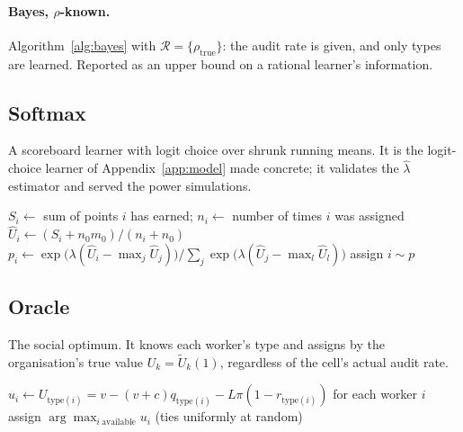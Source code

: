 \documentclass[11pt,letterpaper]{article}
\newcommand{\Ut}{\tilde U}
\numberwithin{equation}{section}
\numberwithin{table}{section}
\numberwithin{figure}{section}
\numberwithin{algorithm}{section}
\begin{document}
\paragraph{Bayes, $\rho$-known.} Algorithm~\ref{alg:bayes} with $\mathcal R=\{\rho_{\text{true}}\}$: the audit rate is given, and only types are learned. Reported as an upper bound on a rational learner's information.

\subsection{Softmax}

A scoreboard learner with logit choice over shrunk running means. It is the logit-choice learner of Appendix~\ref{app:model} made concrete; it validates the $\hat\lambda$ estimator and served the power simulations.

\begin{algorithm}[H]
\caption{Softmax ($\lambda=0.5$, $n_0=1$, $m_0=v$)}
\label{alg:softmax}
\begin{algorithmic}[1]
    \State $S_i\gets$ sum of points $i$ has earned; $n_i\gets$ number of times $i$ was assigned
    \State $\hat U_i\gets(S_i+n_0m_0)/(n_i+n_0)$ 
  \EndFor
  \State $p_i\gets\exp\bigl(\lambda(\hat U_i-\max_j\hat U_j)\bigr)\big/\sum_j\exp\bigl(\lambda(\hat U_j-\max_l\hat U_l)\bigr)$
  \State assign $i\sim p$
\EndFor
\end{algorithmic}
\end{algorithm}

\subsection{Oracle}

The social optimum. It knows each worker's type and assigns by the organisation's true value $U_k=\Ut_k(1)$, regardless of the cell's actual audit rate.

\begin{algorithm}[H]
\caption{Oracle}
\label{alg:oracle}
\begin{algorithmic}[1]
\State $u_i\gets U_{\text{type}(i)}=v-(v+c)q_{\text{type}(i)}-L\pi(1-r_{\text{type}(i)})$ for each worker $i$ 
  \State assign $\arg\max_{i\ \text{available}}u_i$ (ties uniformly at random) 
\EndFor
\end{algorithmic}
\end{algorithm}
\end{document}
